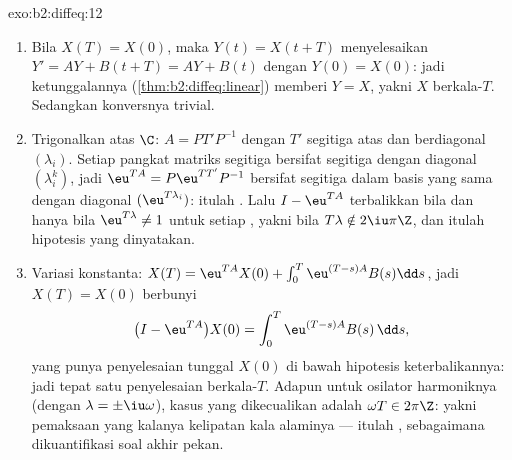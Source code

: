 \begin{solution}{exo:b2:diffeq:12}
\begin{enumerate}
  \item Bila $X(T) = X(0)$, maka $Y(t) = X(t + T)$ menyelesaikan $Y' =
        AY + B(t + T) = AY + B(t)$ dengan $Y(0) = X(0)$: jadi
        ketunggalannya (\cref{thm:b2:diffeq:linear}) memberi $Y = X$,
        yakni $X$ berkala-$T$. Sedangkan konversnya trivial.
  \item Trigonalkan atas $\C$: $A = PT'P^{-1}$ dengan $T'$ segitiga
        atas dan berdiagonal $(\lambda_i)$. Setiap pangkat matriks
        segitiga bersifat segitiga dengan diagonal
        $(\lambda_i^k)$, jadi $\eu^{TA} = P\eu^{TT'}P^{-1}$ bersifat
        segitiga dalam basis yang sama dengan diagonal
        $(\eu^{T\lambda_i})$: itulah . Lalu
        $I - \eu^{TA}$ terbalikkan bila dan hanya bila $\eu^{T\lambda} \neq
        1$ untuk setiap , yakni bila $T\lambda \notin
        2\iu\pi\Z$, dan itulah hipotesis yang dinyatakan.
  \item Variasi konstanta: $X(T) = \eu^{TA}X(0) +
        \int_0^T\eu^{(T-s)A}B(s)\dd s$, jadi $X(T) = X(0)$ berbunyi
        \[
        \bigl(I - \eu^{TA}\bigr)X(0) =
        \int_0^{T}\eu^{(T-s)A}B(s)\,\dd s ,
        \]
        yang punya penyelesaian tunggal $X(0)$ di bawah hipotesis
        keterbalikannya: jadi tepat satu penyelesaian berkala-$T$.
        Adapun untuk osilator harmoniknya (dengan $\lambda =
        \pm\iu\omega$), kasus yang dikecualikan adalah $\omega T \in
        2\pi\Z$: yakni pemaksaan yang kalanya kelipatan
        kala alaminya --- itulah , sebagaimana dikuantifikasi
        soal akhir pekan.
\end{enumerate}
\end{solution}

